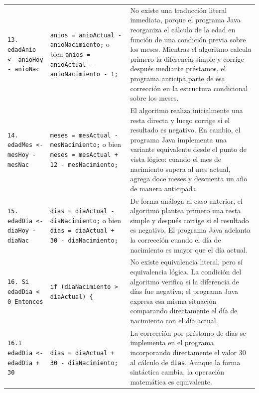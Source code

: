 \documentclass[12pt,twoside]{book}
\begin{document}
\begin{landscape}
\begin{longtable}{p{6cm} p{6cm} p{7cm}}
							
							\texttt{13. edadAnio <- anioHoy - anioNac}
							&
							\texttt{anios = anioActual - anioNacimiento;} \newline
							o bien \newline
							\texttt{anios = anioActual - anioNacimiento - 1;}
							&
							No existe una traducción literal inmediata, porque el programa Java reorganiza el cálculo de la edad en función de una condición previa sobre los meses. Mientras el algoritmo calcula primero la diferencia simple y corrige después mediante préstamos, el programa anticipa parte de esa corrección en la estructura condicional sobre los meses. \\
							
							
							\texttt{14. edadMes <- mesHoy - mesNac}
							&
							\texttt{meses = mesActual - mesNacimiento;} \newline
							o bien \newline
							\texttt{meses = mesActual + 12 - mesNacimiento;}
							&
							El algoritmo realiza inicialmente una resta directa y luego corrige si el resultado es negativo. En cambio, el programa Java implementa una variante equivalente desde el punto de vista lógico: cuando el mes de nacimiento supera al mes actual, agrega doce meses y descuenta un año de manera anticipada. \\
							
							
							\texttt{15. edadDia <- diaHoy - diaNac}
							&
							\texttt{dias = diaActual - diaNacimiento;} \newline
							o bien \newline
							\texttt{dias = diaActual + 30 - diaNacimiento;}
							&
							De forma análoga al caso anterior, el algoritmo plantea primero una resta simple y después corrige si el resultado es negativo. El programa Java adelanta la corrección cuando el día de nacimiento es mayor que el día actual. \\
							
							
							\texttt{16. Si edadDia < 0 Entonces}
							&
							\texttt{if (diaNacimiento > diaActual) \{}
							&
							No existe equivalencia literal, pero sí equivalencia lógica. La condición del algoritmo verifica si la diferencia de días fue negativa; el programa Java expresa esa misma situación comparando directamente el día de nacimiento con el día actual. \\
							
							
							\texttt{16.1 edadDia <- edadDia + 30}
							&
							\texttt{dias = diaActual + 30 - diaNacimiento;}
							&
							La corrección por préstamo de días se implementa en el programa incorporando directamente el valor 30 al cálculo de \texttt{dias}. Aunque la forma sintáctica cambia, la operación matemática es equivalente. \\
							

\end{longtable}
\end{landscape}
\end{document}
